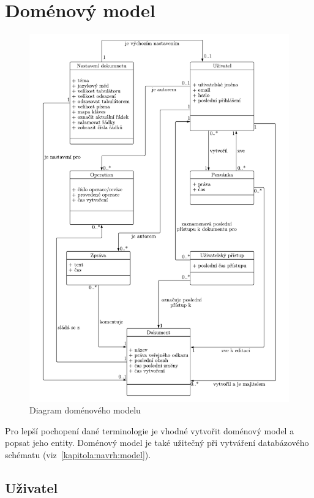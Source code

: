 \section{Doménový model}\label{sec:domenovyModel}

\begin{figure}[ht]
    \centering
    \includegraphics[width=\textwidth]{partials/analyza/domenovy_model-2.pdf}
    \caption{Diagram doménového modelu}\label{fig:domenovy_model}
\end{figure}

Pro lepší pochopení dané terminologie je vhodné vytvořit doménový model a popsat jeho entity.
Doménový model je také užitečný při vytváření databázového schématu (viz~\ref{kapitola:navrh:model}).

\subsection{Uživatel}\label{subsec:uživatel}

